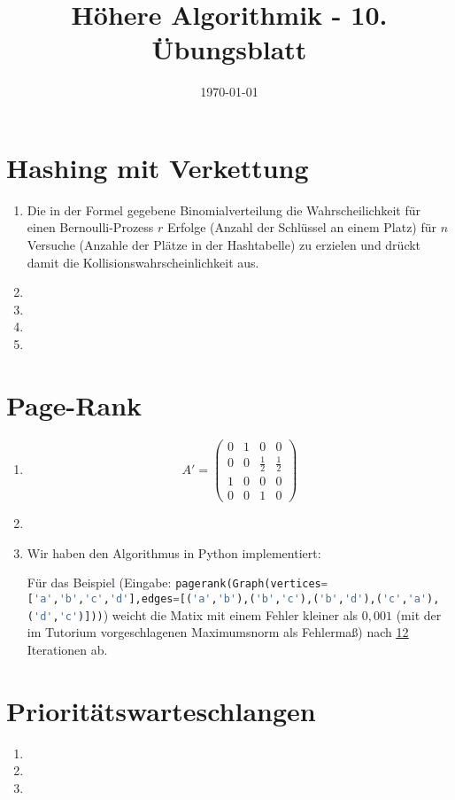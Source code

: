 \documentclass[a4paper,10pt]{article}
\title{H\"ohere Algorithmik - 10. \"Ubungsblatt}
\author{\Authors}
\date{\today}
\begin{document}
\maketitle

\section{Hashing mit Verkettung}
\begin{enumerate}
\item   Die in der Formel gegebene Binomialverteilung die Wahrscheilichkeit für einen Bernoulli-Prozess $r$ Erfolge (Anzahl der Schlüssel an einem Platz) für $n$ Versuche (Anzahle der Plätze in der Hashtabelle) zu erzielen und drückt damit die Kollisionswahrscheinlichkeit aus.
\item   
\item   
\item   
\item   
\end{enumerate}

\section{Page-Rank}
\begin{enumerate}
\item   \[
            A' = \begin{pmatrix}
                0 & 1 & 0 & 0 \\
                0 & 0 & \frac{1}{2} & \frac{1}{2} \\
                1 & 0 & 0 & 0 \\
                0 & 0 & 1 & 0
            \end{pmatrix}
        \]
\item   
\item   Wir haben den Algorithmus in Python implementiert:
        
        Für das Beispiel (Eingabe: \lstinline[language=Python]!pagerank(Graph(vertices=['a','b','c','d'],edges=[('a','b'),('b','c'),('b','d'),('c','a'),('d','c')]))!) weicht die Matix mit einem Fehler kleiner als $0{,}001$ (mit der im Tutorium vorgeschlagenen Maximumsnorm als Fehlermaß) nach \underline{\underline{12}} Iterationen ab.
\end{enumerate}

\section{Prioritätswarteschlangen}
\begin{enumerate}
\item   
\item   
\item   
\end{enumerate}
\end{document}
